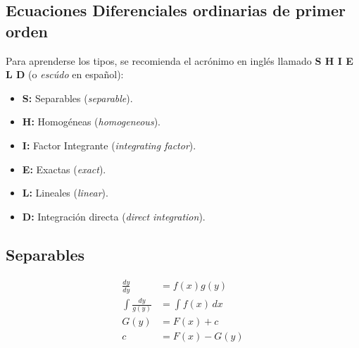 \documentclass[letterpaper, 12pt]{article}
\begin{document}
    \newpage
    \begin{justify}
        \thispagestyle{fancy}
        \section*{Ecuaciones Diferenciales ordinarias de primer orden}
        \justify
        Para aprenderse los tipos, se recomienda el acrónimo en inglés llamado \textbf{S H I E L D} (o \emph{escúdo} en español):
        \begin{itemize}
            \item \textbf{S:} Separables (\emph{separable}).
            \item \textbf{H:} Homogéneas (\emph{homogeneous}).
            \item \textbf{I:} Factor Integrante (\emph{integrating factor}).
            \item \textbf{E:} Exactas (\emph{exact}).
            \item \textbf{L:} Lineales (\emph{linear}).
            \item \textbf{D:} Integración directa (\emph{direct integration}).
        \end{itemize}
        \subsection*{Separables}
        {\large\begin{equation*}
            \begin{aligned}
                \frac{dy}{dy}&=f(x)g(y)\\[5pt]
                \int \frac{dy}{g(y)}&=\int f(x)\, dx\\[5pt]
                G(y)&=F(x)+c\\[5pt]
                c&=F(x)-G(y)
            \end{aligned}
        \end{equation*}}

\end{justify}
\end{document}
